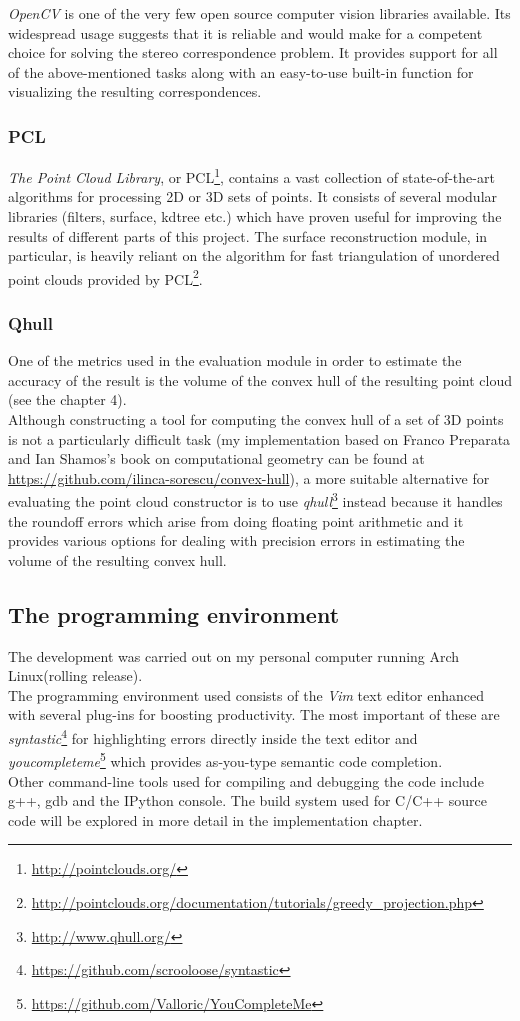 \documentclass[12pt,a4paper,twoside,openright]{report}
\begin{document}
\emph{OpenCV} is one of the very few open source computer vision libraries available. Its widespread usage suggests that it is reliable and would make for a competent choice for solving the stereo correspondence problem. It provides support for all of the above-mentioned tasks along with an easy-to-use built-in function for visualizing the resulting correspondences.

\subsubsection{PCL}
\emph{The Point Cloud Library}, or PCL\footnote{\url{http://pointclouds.org/}}, contains a vast collection of state-of-the-art algorithms for processing 2D or 3D sets of points. It consists of several modular libraries (filters, surface, kdtree etc.) which have proven useful for improving the results of different parts of this project. The surface reconstruction module, in particular, is heavily reliant on the algorithm for fast triangulation of unordered point clouds\cite{Marton09ICRA} provided by PCL\footnote{\url{http://pointclouds.org/documentation/tutorials/greedy_projection.php}}.

\subsubsection{Qhull}
One of the metrics used in the evaluation module in order to estimate the accuracy of the result is the volume of the convex hull of the resulting point cloud (see the chapter 4).\\
Although constructing a tool for computing the convex hull of a set of 3D points is not a particularly difficult task (my implementation based on Franco Preparata and Ian Shamos's book on computational geometry\cite{Preparata} can be found at \url{https://github.com/ilinca-sorescu/convex-hull}), a more suitable alternative for evaluating the point cloud constructor is to use \emph{qhull}\footnote{\url{http://www.qhull.org/}} instead because it handles the roundoff errors which arise from doing floating point arithmetic and it provides various options for dealing with precision errors in estimating the volume of the resulting convex hull. 

\subsection{The programming environment}
The development was carried out on my personal computer running Arch Linux(rolling release).\\
The programming environment used consists of the \textit{Vim} text editor enhanced with several plug-ins for boosting productivity. The most important of these are \textit{syntastic}\footnote{\url{https://github.com/scrooloose/syntastic}} for highlighting errors directly inside the text editor and \textit{youcompleteme}\footnote{\url{https://github.com/Valloric/YouCompleteMe}} which provides as-you-type semantic code completion.\\
Other command-line tools used for compiling and debugging the code include g++, gdb and the IPython console. The build system used for C/C++ source code will be explored in more detail in the implementation chapter.
\end{document}
